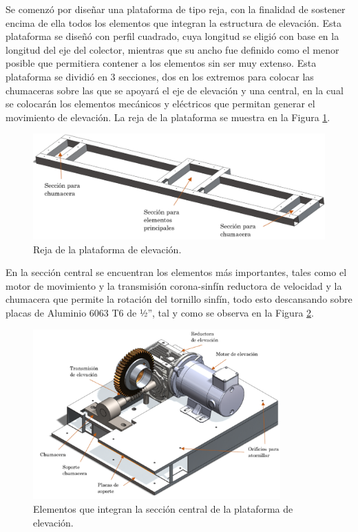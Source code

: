 Se comenzó por diseñar una plataforma de tipo reja, con la finalidad de sostener encima de ella todos los elementos que integran la estructura de elevación. Esta plataforma se diseñó con perfil cuadrado, cuya longitud se eligió con base en la longitud del eje del colector, mientras que su ancho fue definido como el menor posible que permitiera contener a los elementos sin ser muy extenso. Esta plataforma se dividió en 3 secciones, dos en los extremos para colocar las chumaceras sobre las que se apoyará el eje de elevación y una central, en la cual se colocarán los elementos mecánicos y eléctricos que permitan generar el movimiento de elevación. La reja de la plataforma se muestra en la Figura \ref{fig:ele1}.

\begin{figure}[H]
	\centering
	\includegraphics[width=13cm]{imagenes/ele1}
	\caption{Reja de la plataforma de elevación.}
	\label{fig:ele1}
\end{figure}

En la sección central se encuentran los elementos más importantes, tales como el motor de movimiento y la transmisión corona-sinfín reductora de velocidad y la chumacera que permite la rotación del tornillo sinfín, todo esto descansando sobre placas de Aluminio 6063 T6 de ½”, tal y como se observa en la Figura \ref{fig:ele2}.

\begin{figure}[H]
	\centering
	\includegraphics[width=9.5cm]{imagenes/ele2}
	\caption{Elementos que integran la sección central de la plataforma de elevación.}
	\label{fig:ele2}
\end{figure}

